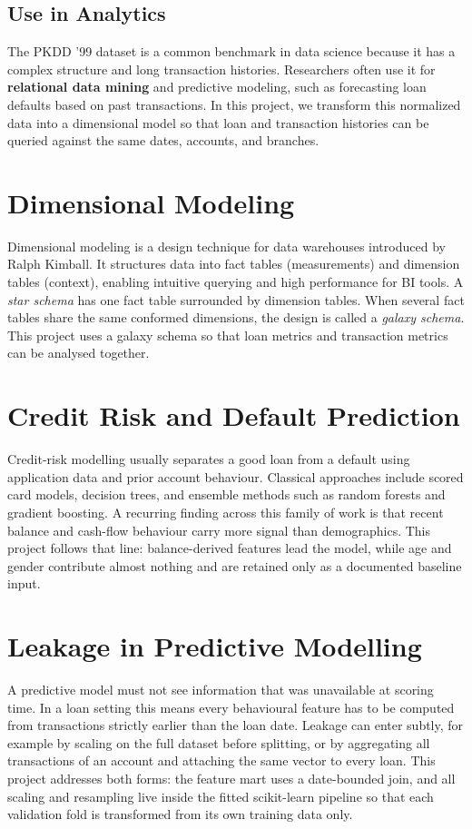 \subsection*{Use in Analytics}
The PKDD '99 dataset is a common benchmark in data science because it has a complex structure and long transaction histories. Researchers often use it for \textbf{relational data mining} and predictive modeling, such as forecasting loan defaults based on past transactions. In this project, we transform this normalized data into a dimensional model so that loan and transaction histories can be queried against the same dates, accounts, and branches.

\section{Dimensional Modeling}
Dimensional modeling is a design technique for data warehouses introduced by Ralph Kimball. It structures data into fact tables (measurements) and dimension tables (context), enabling intuitive querying and high performance for BI tools. A \textit{star schema} has one fact table surrounded by dimension tables. When several fact tables share the same conformed dimensions, the design is called a \textit{galaxy schema}. This project uses a galaxy schema so that loan metrics and transaction metrics can be analysed together.

\section{Credit Risk and Default Prediction}
Credit-risk modelling usually separates a good loan from a default using application data and prior account behaviour. Classical approaches include scored card models, decision trees, and ensemble methods such as random forests and gradient boosting. A recurring finding across this family of work is that recent balance and cash-flow behaviour carry more signal than demographics. This project follows that line: balance-derived features lead the model, while age and gender contribute almost nothing and are retained only as a documented baseline input.

\section{Leakage in Predictive Modelling}
A predictive model must not see information that was unavailable at scoring time. In a loan setting this means every behavioural feature has to be computed from transactions strictly earlier than the loan date. Leakage can enter subtly, for example by scaling on the full dataset before splitting, or by aggregating all transactions of an account and attaching the same vector to every loan. This project addresses both forms: the feature mart uses a date-bounded join, and all scaling and resampling live inside the fitted scikit-learn pipeline so that each validation fold is transformed from its own training data only.


